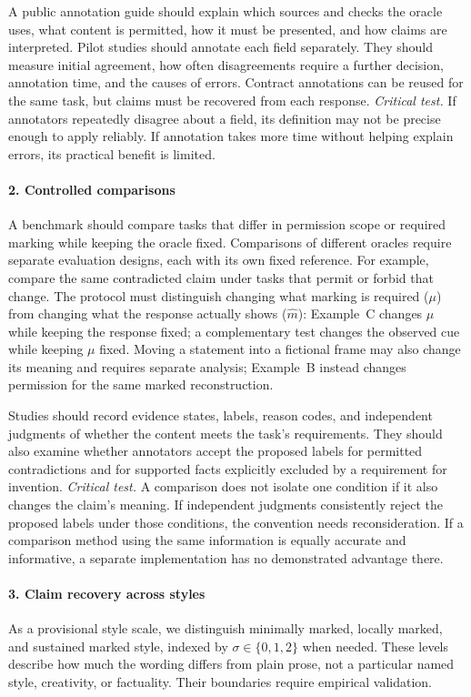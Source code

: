 \documentclass{clv2025}
\begin{document}
A public annotation guide should explain which sources and checks the oracle
uses, what content is permitted, how it must be presented, and how claims are
interpreted. Pilot studies should annotate each field separately. They should
measure initial agreement, how often disagreements require a further decision,
annotation time, and the causes of errors. Contract annotations can be reused
for the same task, but claims must be recovered from each response.
\emph{Critical test.} If annotators repeatedly disagree about a field, its
definition may not be precise enough to apply reliably. If annotation takes
more time without helping explain errors, its practical benefit is limited.

\paragraph{2. Controlled comparisons}
A benchmark should compare tasks that differ in permission scope or required
marking while keeping the oracle fixed. Comparisons of different oracles
require separate evaluation designs, each with its own fixed reference.
For example, compare the same contradicted claim under tasks that permit
or forbid that change. The protocol must distinguish changing what marking
is required ($\mu$) from changing what the response actually shows
($\widehat{m}$): Example~C changes $\mu$ while keeping the response fixed;
a complementary test changes the observed cue while keeping $\mu$ fixed.
Moving a statement into a fictional frame may also change its meaning and
requires separate analysis; Example~B instead changes permission for the
same marked reconstruction.

Studies should record evidence states, labels, reason codes, and independent
judgments of whether the content meets the task's requirements. They should
also examine whether annotators accept the proposed labels for permitted
contradictions and for supported facts explicitly excluded by a requirement
for invention.
\emph{Critical test.} A comparison does not isolate one condition if it also
changes the claim's meaning. If independent judgments consistently reject
the proposed labels under those conditions, the convention needs reconsideration.
If a comparison method using the same information is equally accurate and
informative, a separate implementation has no demonstrated advantage there.

\paragraph{3. Claim recovery across styles}\label{par:style-scale}
As a provisional style scale, we distinguish minimally marked, locally
marked, and sustained marked style, indexed by $\sigma\in\{0,1,2\}$ when
needed. These levels describe how much the wording differs from plain prose,
not a particular named style, creativity, or factuality. Their boundaries
require empirical validation.
\end{document}
